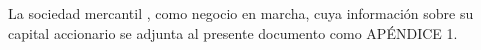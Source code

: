 La sociedad mercantil \textcolor{principal}{\empresaSolicitante}, como negocio en marcha, cuya información sobre su capital accionario se adjunta al presente documento como APÉNDICE 1.\\
